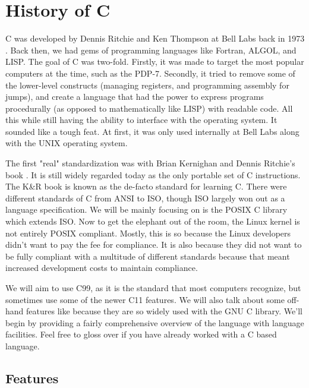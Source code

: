 \section{History of C}

C was developed by \gls{Dennis Ritchie} and \gls{Ken Thompson} at \gls{Bell Labs} back in 1973 \cite{Ritchie:1993:DCL:155360.155580}.
Back then, we had gems of programming languages like \gls{Fortran}, \gls{ALGOL}, and \gls{LISP}.
The goal of C was two-fold.
Firstly, it was made to target the most popular computers at the time, such as the \gls{PDP-7}.
Secondly, it tried to remove some of the lower-level constructs (managing \gls{registers}, and programming assembly for \gls{jumps}), and create a language that had the power to express programs procedurally (as opposed to mathematically like LISP) with readable code.
All this while still having the ability to interface with the operating system.
It sounded like a tough feat.
At first, it was only used internally at Bell Labs along with the UNIX operating system.

The first "real" standardization was with \gls{Brian Kernighan} and Dennis Ritchie's book \cite{kernighan1988c}.
It is still widely regarded today as the only \gls{portable} set of C instructions.
The K\&R book is known as the de-facto standard for learning C.
There were different standards of C from \gls{ANSI} to \gls{ISO}, though ISO largely won out as a language specification.
We will be mainly focusing on is the \gls{POSIX} C library which extends ISO.
Now to get the elephant out of the room, the \gls{Linux kernel} is not entirely POSIX compliant.
Mostly, this is so because the Linux developers didn't want to pay the fee for compliance.
It is also because they did not want to be fully compliant with a multitude of different standards because that meant increased development costs to maintain compliance.

We will aim to use C99, as it is the standard that most computers recognize, but sometimes use some of the newer C11 features.
We will also talk about some off-hand features like  because they are so widely used with the \gls{GNU C library}.
We'll begin by providing a fairly comprehensive overview of the language with language facilities.
Feel free to gloss over if you have already worked with a C based language.

\subsection{Features}

